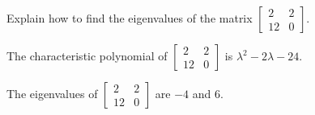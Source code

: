
\begin{exerciseStatement}


Explain how to find the eigenvalues of the matrix \( \left[\begin{array}{cc}
2 & 2 \\
12 & 0
\end{array}\right] \).


\end{exerciseStatement}
    
\begin{exerciseAnswer} 


The characteristic polynomial of \( \left[\begin{array}{cc}
2 & 2 \\
12 & 0
\end{array}\right] \) is \( \lambda^{2} - 2 \lambda - 24 \).



The eigenvalues of \( \left[\begin{array}{cc}
2 & 2 \\
12 & 0
\end{array}\right] \) are \( -4 \) and \( 6 \).


\end{exerciseAnswer}
    
